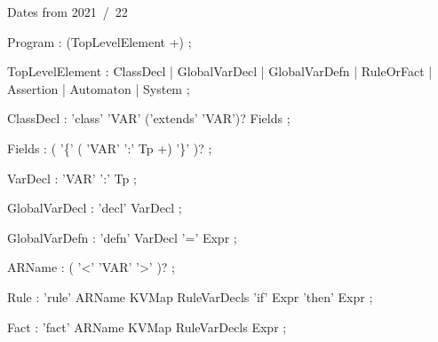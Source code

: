 \begin{tcolorbox}[breakable,colback=red!5!white,colframe=red!75!black,
  title=Comments on status]
Dates from 2021~/~22
\end{tcolorbox}

\hypertarget{syn:Program}{}
\begin{rail}
  Program : (TopLevelElement +)
  ;
\end{rail}

\hypertarget{syn:TopLevelElement}{}
\begin{rail}
TopLevelElement : ClassDecl     
                | GlobalVarDecl 
                | GlobalVarDefn 
                | RuleOrFact    
                | Assertion     
                | Automaton     
                | System        
;
\end{rail}

\hypertarget{syn:ClassDecl}{}
\begin{rail}
ClassDecl : 'class' 'VAR' ('extends' 'VAR')? Fields
;                
\end{rail}

\hypertarget{syn:Fields}{}
\begin{rail}
Fields : ( '\{' (  'VAR' ':' Tp  +) '\}' )?
;
\end{rail}

\hypertarget{syn:VarDecl}{}
\begin{rail}
VarDecl : 'VAR' ':' Tp
;
\end{rail}

\hypertarget{syn:GlobalVarDecl}{}
\begin{rail}
GlobalVarDecl : 'decl' VarDecl
;
\end{rail}


\hypertarget{syn:GlobalVarDefn}{}
\begin{rail}
GlobalVarDefn : 'defn' VarDecl '=' Expr  
;
\end{rail}

\hypertarget{syn:ARName}{}
\begin{rail}
ARName : ( '<' 'VAR' '>' )?
;
\end{rail}

\hypertarget{syn:Rule}{}
\begin{rail}
Rule : 'rule' ARName  KVMap RuleVarDecls 'if' Expr 'then' Expr
;
\end{rail}

\hypertarget{syn:Fact}{}
\begin{rail}
Fact : 'fact' ARName  KVMap RuleVarDecls Expr
;
\end{rail}

